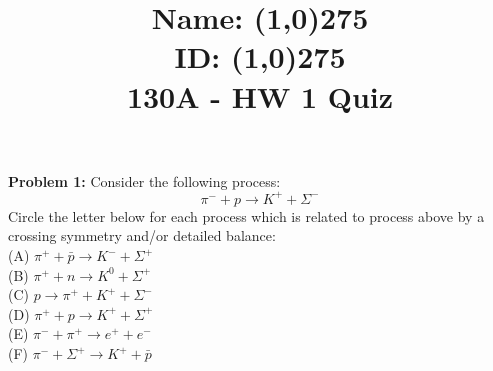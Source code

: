 \documentclass[12pt]{article}
\begin{document}
\newcommand{\ihbar}{\ensuremath{i \hbar}}
\newcommand{\dPsidt}{\ensuremath{ \frac{\partial \Psi}{\partial t} }}
\newcommand{\dPsidx}{\ensuremath{ \frac{\partial \Psi}{\partial x} }}
\newcommand{\ddPsidx}{\ensuremath{ \frac{\partial^2 \Psi}{\partial x^2} }}
\newcommand{\dPssdt}{\ensuremath{ \frac{\partial \Psi^*}{\partial t} }}
\newcommand{\dPssdx}{\ensuremath{ \frac{\partial \Psi^*}{\partial x} }}
\newcommand{\ddPssdx}{\ensuremath{ \frac{\partial^2 \Psi^*}{\partial x^2} }}

\newcommand{\dphidt}{\ensuremath{ \frac{d \phi}{dt} }}
\newcommand{\dpsidx}{\ensuremath{ \frac{d \psi}{dx} }}
\newcommand{\ddpsidx}{\ensuremath{ \frac{d^2 \psi}{dx^2} }}


\date{\vspace{-5ex}}


\title{Name: \line(1,0){275}\\ 
ID: \line(1,0){275}\\
130A - HW 1 Quiz}
\date{}

\maketitle

\noindent
{\bf Problem 1:}  Consider the following process:
$$ \pi^- + p \to K^+ + \Sigma^-$$    
Circle the letter below for each process which is related to process above by a crossing symmetry and/or detailed balance:\\[5pt]
(A) $ \pi^+ + \bar{p} \to K^- + \Sigma^+$\\[5pt]    
(B) $ \pi^+ + n \to K^0 + \Sigma^+$\\[5pt]    
(C) $ p \to \pi^+ +  K^+ + \Sigma^-$\\[5pt]
(D) $ \pi^+ + p \to K^+ + \Sigma^+$\\[5pt]    
(E) $ \pi^- + \pi^+  \to e^+ + e^-$\\[5pt]    
(F) $ \pi^- + \Sigma^+  \to K^+ + \bar{p}$\\[5pt]    
\end{document}
